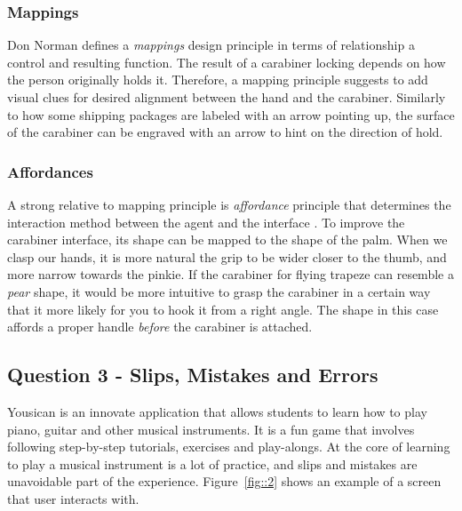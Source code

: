 \documentclass[12pt,letterpaper]{article}
\begin{document}
\subsubsection*{Mappings}
Don Norman defines a  \textit{mappings} design principle in terms of relationship a control and resulting function\cite{norman2013design}. The result of a carabiner locking depends on how the person originally holds it. Therefore, a mapping principle suggests to add visual clues for desired alignment between the hand and the carabiner. Similarly to how some shipping packages are labeled with an arrow pointing up, the surface of the carabiner can be engraved with an arrow to hint on the direction of hold.    

\subsubsection*{Affordances}
A strong relative to mapping principle is \textit{affordance} principle that determines the interaction method between the agent and the interface \cite{norman2013design}. To improve the carabiner interface, its shape can be mapped to the shape of the palm. When we clasp our hands, it is more natural the grip to be wider closer to the thumb, and more narrow towards the pinkie. If the carabiner for flying trapeze can resemble a \textit{pear} shape, it would be more intuitive to grasp the carabiner in a certain way that it more likely for you to hook it from a right angle. The shape in this case affords a proper handle \textit{before} the carabiner is attached.


\subsection*{Question 3 - Slips, Mistakes and Errors}
Yousican is an innovate application that allows students to learn how to play piano, guitar and other musical instruments\cite{eli2017yousician}. It is a fun game that involves following step-by-step tutorials, exercises and play-alongs. At the core of learning to play a musical instrument is a lot of practice, and slips and mistakes are unavoidable part of the experience. Figure~\ref{fig::2} shows an example of a screen that user interacts with.
\end{document}
